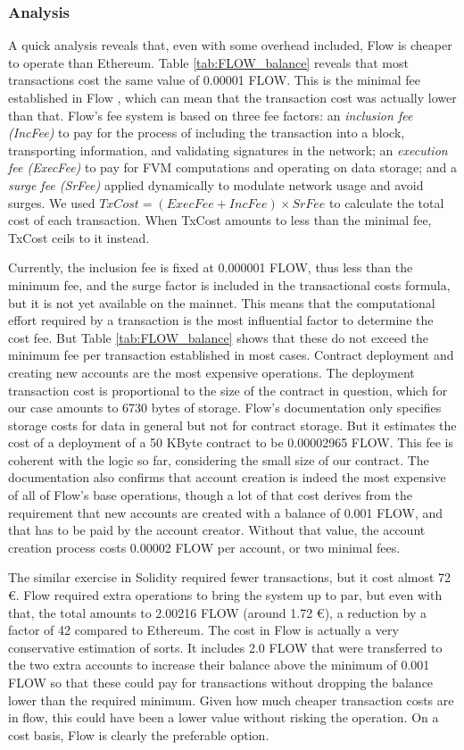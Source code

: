 \documentclass[../NFTComp_IEEE.tex]{subfiles}
\begin{document}
\subsubsection{Analysis}
A quick analysis reveals that, even with some overhead included, Flow is cheaper to operate than Ethereum. Table \ref{tab:FLOW_balance} reveals that most transactions cost the same value of 0.00001 FLOW. This is the minimal fee established in Flow \cite{flow2024d}, which can mean that the transaction cost was actually lower than that. Flow's fee system is based on three fee factors: an \textit{inclusion fee (IncFee)} to pay for the process of including the transaction into a block, transporting information, and validating signatures in the network; an \textit{execution fee (ExecFee)} to pay for FVM computations and operating on data storage; and a \textit{surge fee (SrFee)} applied dynamically to modulate network usage and avoid surges. We used $ TxCost = (ExecFee + IncFee) \times SrFee $ to calculate the total cost of each transaction. When TxCost amounts to less than the minimal fee, TxCost ceils to it instead.
\par
Currently, the inclusion fee is fixed at 0.000001 FLOW, thus less than the minimum fee, and the surge factor is included in the transactional costs formula, but it is not yet available on the mainnet. This means that the computational effort required by a transaction is the most influential factor to determine the cost fee. But Table \ref{tab:FLOW_balance} shows that these do not exceed the minimum fee per transaction established in most cases. Contract deployment and creating new accounts are the most expensive operations. The deployment transaction cost is proportional to the size of the contract in question, which for our case amounts to 6730 bytes of storage. Flow's documentation only specifies storage costs for data in general but not for contract storage. But it estimates the cost of a deployment of a 50 KByte contract to be 0.00002965 FLOW. This fee is coherent with the logic so far, considering the small size of our contract. The documentation also confirms that account creation is indeed the most expensive of all of Flow's base operations, though a lot of that cost derives from the requirement that new accounts are created with a balance of 0.001 FLOW, and that has to be paid by the account creator. Without that value, the account creation process costs 0.00002 FLOW per account, or two minimal fees.
\par
The similar exercise in Solidity required fewer transactions, but it cost almost 72 €. Flow required extra operations to bring the system up to par, but even with that, the total amounts to 2.00216 FLOW (around 1.72 €), a reduction by a factor of 42 compared to Ethereum. The cost in Flow is actually a very conservative estimation of sorts. It includes 2.0 FLOW that were transferred to the two extra accounts to increase their balance above the minimum of 0.001 FLOW so that these could pay for transactions without dropping the balance lower than the required minimum. Given how much cheaper transaction costs are in flow, this could have been a lower value without risking the operation. On a cost basis, Flow is clearly the preferable option.
\end{document}
